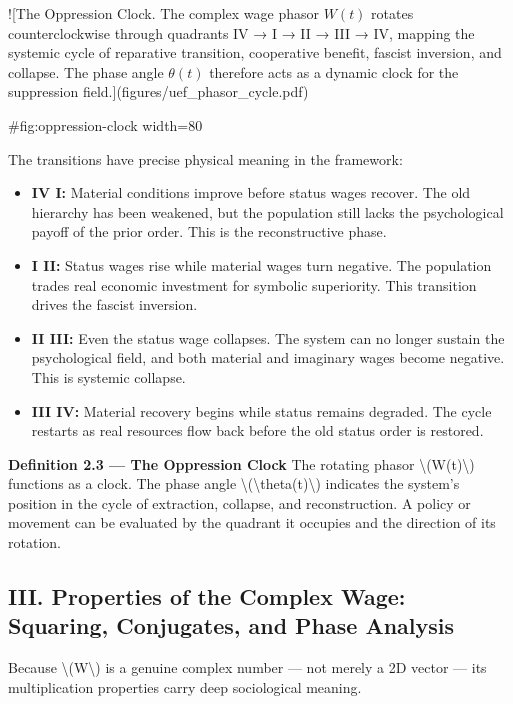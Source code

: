 ![The Oppression Clock. The complex wage phasor $W(t)$ rotates
counterclockwise through quadrants IV → I → II → III → IV, mapping the
systemic cycle of reparative transition, cooperative benefit, fascist
inversion, and collapse. The phase angle $\theta(t)$ therefore acts as a
dynamic clock for the suppression field.](figures/uef_phasor_cycle.pdf){#fig:oppression-clock
width=80%

The transitions have precise physical meaning in the framework:

\begin{itemize}
\tightlist
\item
  \textbf{IV \rightarrow I:} Material conditions improve before status
  wages recover. The old hierarchy has been weakened, but the
  population still lacks the psychological payoff of the prior order.
  This is the reconstructive phase.
\item
  \textbf{I \rightarrow II:} Status wages rise while material wages
  turn negative. The population trades real economic investment for
  symbolic superiority. This transition drives the fascist inversion.
\item
  \textbf{II \rightarrow III:} Even the status wage collapses. The
  system can no longer sustain the psychological field, and both
  material and imaginary wages become negative. This is systemic
  collapse.
\item
  \textbf{III \rightarrow IV:} Material recovery begins while status
  remains degraded. The cycle restarts as real resources flow back
  before the old status order is restored.
\end{itemize}

\textbf{Definition 2.3 --- The Oppression Clock} The rotating phasor
\textbackslash(W(t)\textbackslash) functions as a clock. The phase
angle \textbackslash(\textbackslash theta(t)\textbackslash) indicates
the system's position in the cycle of extraction, collapse, and
reconstruction. A policy or movement can be evaluated by the quadrant it
occupies and the direction of its rotation.

\protect{}\label{sec-complex-properties}
\subsection{III. Properties of the Complex Wage: Squaring, Conjugates,
and Phase
Analysis}\label{iii.-properties-of-the-complex-wage-squaring-conjugates-and-phase-analysis}

Because \textbackslash(W\textbackslash) is a genuine complex number ---
not merely a 2D vector --- its multiplication properties carry deep
sociological meaning.

}
